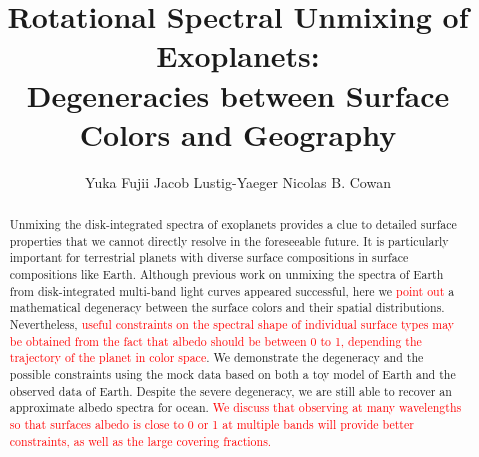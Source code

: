 \documentclass[iop,numberedappendix,apj]{emulateapj}
\def\edit#1{\textcolor{red}{#1}}
\begin{document}
\title{Rotational Spectral Unmixing of Exoplanets:\\Degeneracies between Surface Colors and Geography}


\author{
%
Yuka Fujii 
%
Jacob Lustig-Yaeger 
%
Nicolas B. Cowan 
%
}

      
  







\vspace{0.5\baselineskip}


\begin{abstract}

Unmixing the disk-integrated spectra of exoplanets provides a clue to  detailed surface properties that we cannot directly resolve in the foreseeable future. 
It is particularly important for terrestrial planets with diverse surface compositions in surface compositions like Earth. 
Although previous work on unmixing the spectra of Earth from disk-integrated multi-band light curves appeared successful, here we \edit{point out} a mathematical degeneracy between the surface colors and their spatial  distributions. 
Nevertheless, \edit{useful constraints on the spectral shape of individual surface types may be obtained from the fact that albedo should be between 0 to 1, depending the trajectory of the planet in color space}.  
We demonstrate the degeneracy and the possible constraints using the mock data based on both a toy model of Earth and the observed data of Earth. 
Despite the severe degeneracy, we are still able to recover an approximate albedo spectra for ocean. 
\edit{We discuss that observing at many wavelengths so that surfaces albedo is close to 0 or 1 at multiple bands will provide better constraints, as well as the large covering fractions. }

\end{abstract}
\end{document}
